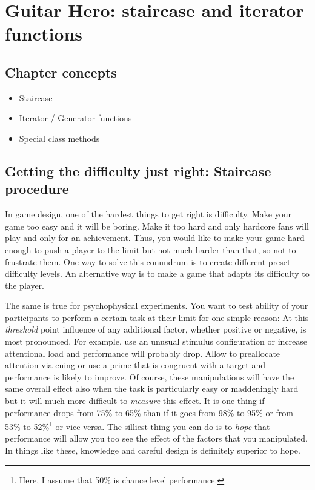 \documentclass[
]{book}
\providecommand{\tightlist}{%
  \setlength{\itemsep}{0pt}\setlength{\parskip}{0pt}}
\begin{document}
\hypertarget{seminar-02-06}{%
\chapter{Guitar Hero: staircase and iterator functions}\label{seminar-02-06}}

\hypertarget{chapter-concepts-8}{%
\section{Chapter concepts}\label{chapter-concepts-8}}

\begin{itemize}
\tightlist
\item
  Staircase
\item
  Iterator / Generator functions
\item
  Special class methods
\end{itemize}

\hypertarget{getting-the-difficulty-just-right-staircase-procedure}{%
\section{Getting the difficulty just right: Staircase procedure}\label{getting-the-difficulty-just-right-staircase-procedure}}

In game design, one of the hardest things to get right is difficulty. Make your game too easy and it will be boring. Make it too hard and only hardcore fans will play and only for \href{https://www.imdb.com/title/tt4975856/}{an achievement}. Thus, you would like to make your game hard enough to push a player to the limit but not much harder than that, so not to frustrate them. One way to solve this conundrum is to create different preset difficulty levels. An alternative way is to make a game that adapts its difficulty to the player.

The same is true for psychophysical experiments. You want to test ability of your participants to perform a certain task at their limit for one simple reason: At this \emph{threshold} point influence of any additional factor, whether positive or negative, is most pronounced. For example, use an unusual stimulus configuration or increase attentional load and performance will probably drop. Allow to preallocate attention via cuing or use a prime that is congruent with a target and performance is likely to improve. Of course, these manipulations will have the same overall effect also when the task is particularly easy or maddeningly hard but it will much more difficult to \emph{measure} this effect. It is one thing if performance drops from 75\% to 65\% than if it goes from 98\% to 95\% or from 53\% to 52\%\footnote{Here, I assume that 50\% is chance level performance.} or vice versa. The silliest thing you can do is to \emph{hope} that performance will allow you too see the effect of the factors that you manipulated. In things like these, knowledge and careful design is definitely superior to hope.
\end{document}
